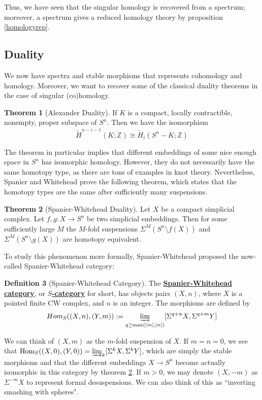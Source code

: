 \documentclass{article}
\theoremstyle{definition}
\newtheorem{theorem}{Theorem}[section] %
\newtheorem{definition}[theorem]{Definition}
\begin{document}
Thus, we have seen that the singular homology is recovered from a spectrum; moreover, a spectrum gives a reduced homology theory by proposition \ref{homologyrep}.


\subsection{Duality}
We now have spectra and stable morphisms that represents cohomology and homology. Moreover, we want to recover some of the classical duality theorems in the case of singular (co)homology. 

\begin{tcolorbox}[colback=red!5!white,colframe=red!30!white]
\begin{theorem}[Alexander Duality]
If $K$ is a compact, locally contractible, nonempty, proper subspace of $S^n$. Then we have the isomorphism
\[\tilde{H}^{n-i-1}(K;\mathbb{Z})\cong \tilde{H}_i(S^n-K;\mathbb{Z})\] 
\end{theorem}
\end{tcolorbox}
The theorem in particular implies that different embeddings of some nice enough space in $S^n$ has isomorphic homology. However, they do not necessarily have the same homotopy type, as there are tons of examples in knot theory. Nevertheless, Spanier and Whitehead prove the following theorem, which states that the homotopy types are the same after sufficiently many suspensions. 

\begin{tcolorbox}[colback=red!5!white,colframe=red!30!white]
\begin{theorem}[Spanier-Whitehead Duality]
    \label{SWdual}
    Let $X$ be a compact simplicial complex. Let $f,g: X\to S^n$ be two simplicial embeddings. Then for some sufficiently large $M$ the $M$-fold suspensions $\Sigma^M (S^n\setminus f(X))$ and $\Sigma^M (S^n\setminus g(X))$ are homotopy equivalent.
\end{theorem}
\end{tcolorbox}
To study this phenomenon more formally, Spanier-Whitehead proposed the now-called Spanier-Whitehead category:


\begin{tcolorbox}[colback=purple!5!white,colframe=purple!75!black]
\begin{definition}[Spanier-Whitehead Category]
\label{SWcat}
The \underline{\textbf{Spanier-Whitehead category}}, or \underline{\textbf{$S$-category}} for short, has objects pairs $(X,n)$, where $X$ is a pointed finite CW complex, and $n$ is an integer. The morphisms are defined by 
\[Hom_{S}((X,n),(Y,m)):=\varinjlim_{q\geq \textrm{max}(|m|,|n|)}[\Sigma^{q+n} X, \Sigma^{q+m} Y]\]
\end{definition}
\end{tcolorbox}
We can think of $(X,m)$ as the $m$-fold suspension of $X$. If $m=n=0$, we see that $\textrm{Hom}_S((X,0),(Y,0))=\varinjlim_{k}[\Sigma^k X, \Sigma^k Y]$, which are simply the stable morphisms and that the different embeddings $X\to S^n$ become actually isomorphic in this category by theorem \ref*{SWdual}. If $m>0$, we may denote $(X,-m)$ as $\Sigma^{-m}X$ to represent formal desuspensions. We can also think of this as ``inverting smashing with spheres".
\end{document}
